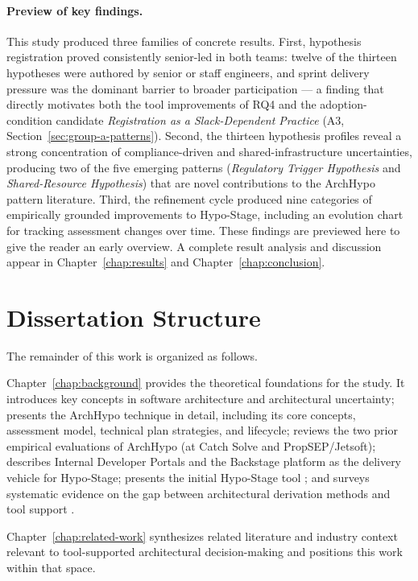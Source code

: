 \paragraph{Preview of key findings.}
This study produced three families of concrete results.
First, hypothesis registration proved consistently senior-led in both teams:
twelve of the thirteen hypotheses were authored by senior or staff engineers,
and sprint delivery pressure was the dominant barrier to broader participation ---
a finding that directly motivates both the tool improvements of RQ4 and the
adoption-condition candidate \emph{Registration as a Slack-Dependent Practice}
(A3, Section~\ref{sec:group-a-patterns}).
Second, the thirteen hypothesis profiles reveal a strong concentration of
compliance-driven and shared-infrastructure uncertainties, producing two of
the five emerging patterns (\textit{Regulatory Trigger Hypothesis} and
\textit{Shared-Resource Hypothesis}) that are novel contributions
to the ArchHypo pattern literature.
Third, the refinement cycle produced nine categories of empirically grounded
improvements to Hypo-Stage, including an evolution chart for tracking
assessment changes over time. These findings are previewed here to give the reader an early overview. A complete result analysis and
discussion appear in Chapter~\ref{chap:results} and Chapter~\ref{chap:conclusion}.

\section{Dissertation Structure}

The remainder of this work is organized as follows.

Chapter~\ref{chap:background} provides the theoretical foundations for the study.
It introduces key concepts in software architecture and architectural uncertainty;
presents the ArchHypo technique in detail, including its core concepts, assessment
model, technical plan strategies, and lifecycle; reviews the two prior empirical
evaluations of ArchHypo (at Catch Solve and PropSEP/Jetsoft); describes Internal
Developer Portals and the Backstage platform as the delivery vehicle for Hypo-Stage;
presents the initial Hypo-Stage tool \citep{correa2025}; and surveys systematic evidence on the gap between architectural
derivation methods and tool support \citep{souza2019}.

Chapter~\ref{chap:related-work} synthesizes related literature and industry context relevant to tool-supported architectural decision-making and positions this work within that space.

